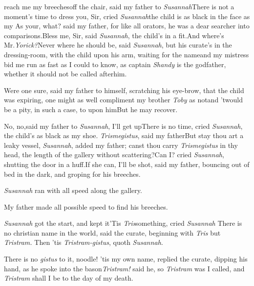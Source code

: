 \documentclass{article}
\begin{document}
reach me my breeches\break off
the chair, said my father to \textit{Susannah}\tsh There is not a
moment’s time to dress you, Sir, cried
\textit{Susannah}\tsk the child is as black in the face as
my\tsh{} As your, what? said my father, for like all orators,
he was a dear searcher into comparisons.\tsk Bless me, Sir, said
\textit{Susannah}, the child’s in a fit.\tsk And
where’s Mr.\@ \textit{Yorick?}\tsk Never where he should be,
said \textit{Susannah}, but his curate’s in the dressing-room,
with the child upon his arm, waiting for the name\tsk and my
mistress bid me run as fast as I could to know, as captain
\textit{Shandy} is the godfather, whether it should not be called
after\break him.

Were one sure, said my father to himself, scratching his
eye-brow, that the child was expiring, one might as well compliment
my brother \textit{Toby} as not\tsk\break and ’twould be a pity, in
such a case, to\break{} upon him\tsk But he may
recover.

No, no,\tsk said my father to \textit{Susannah},
I’ll get up\tsk There is no time, cried\break
\textit{Susannah}, the child’s as black as my shoe.
\textit{Trismegistus}, said my father\tsk But
stay\break
\tsk thou art a leaky vessel, \textit{Susannah}, added my
father; canst thou carry \textit{Trisme\-gistus} in thy head, the
length of the gallery without scattering?\tsk Can I? cried
\textit{Susannah}, shutting the door in a huff.\tsk\break If she
can, I’ll be shot, said my father, bouncing out of bed in the
dark, and groping for his breeches.

\textit{Susannah} ran with all speed along the gallery.

My father made all possible speed to find his breeches.

\textit{Susannah} got the start, and kept it\tsk ’Tis
\textit{Tris}\tsk something, cried \textit{Susannah}\tsk{}
There is no christian name in the world, said the curate, beginning with
\textit{Tris}\tsk\break
but \textit{Tristram.} Then ’tis
\textit{Tristram-gistus}, quoth \textit{Susannah}.

\tsk There is no \textit{gistus} to it, noodle!\tsk\break
’tis my own name, replied the curate,
dipping his hand, as he spoke into the\break
bason\tsk \textit{Tristram!} said he, \etc \etc \etc
\etc so \textit{Tristram} was I called, and \textit{Tristram}
shall I be to the day of my death.
\end{document}

